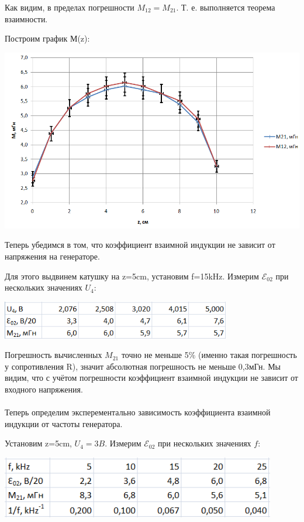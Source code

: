 \documentclass[12pt]{article}
\begin{document}
    Как видим, в пределах погрешности $M_{12} = M_{21}$. Т. е. выполняется теорема взаимности.
    
    Построим график М(z):
    
    \begin{center}
    	\includegraphics[width=17cm]{graph1.png}
    \end{center}
    
    Теперь убедимся в том, что коэффициент взаимной индукции не зависит от напряжения на генераторе.
    
    Для этого выдвинем катушку на z=5cm, установим f=15kHz. Измерим $\mathcal{E}_{02}$ при нескольких значениях $U_4$:
    
    \begin{center}
    	\includegraphics[width=10cm]{table3.png}
    \end{center}
    
    Погрешность вычисленных $M_{21}$ точно не меньше 5\% (именно такая погрешность у сопротивления R), значит абсолютная погрешность не меньше 0,3мГн. Мы видим, что с учётом погрешности коэффициент взаимной индукции не зависит от входного напряжения.\\ \\
    
    Теперь определим эксперементально зависимость коэффициента взаимной индукции от частоты генератора.
    
    Установим z=5cm, $U_4 = 3B$. Измерим $\mathcal{E}_{02}$ при нескольких значениях $f$:
    
    \begin{center}
    	\includegraphics[width=12cm]{table4.png}
    \end{center}
    
\end{document}
